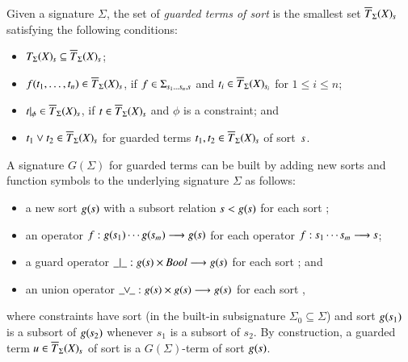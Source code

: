 \begin{definition}\label{def.guarded.guarded}
Given a signature $\Sigma$, the set of \emph{guarded terms of sort
} is the smallest set $\overline{T}_{\Sigma}(X)_{\textit{s}}$
satisfying the following conditions:

\begin{itemize}
	\item ${T}_{\Sigma}(X)_{\textit{s}} \subseteq \overline{T}_{\Sigma}(X)_{\textit{s}}$;
		
	\item $f(t_1,\ldots,t_n) \in \overline{T}_{\Sigma}(X)_{\textit{s}}$,
    if $f\in \Sigma_{\textit{s}_1\ldots \textit{s}_n, \textit{s}}$ and $t_i
    \in \overline{T}_{\Sigma}(X)_{\textit{s}_i}$ for $1 \leq i \leq n$;
	
	\item $t |_{\phi} \in \overline{T}_{\Sigma}(X)_{\textit{s}}$, if $t
    \in \overline{T}_{\Sigma}(X)_{\textit{s}}$ and $\phi$ is a
    constraint; and
	
	\item $t _1 \lor t_2 \in \overline{T}_{\Sigma}(X)_{\textit{s}}$ for
    guarded terms $t_1, t_2 \in \overline{T}_{\Sigma}(X)_{\textit{s}}$
    of sort~$\textit{s}$.
\end{itemize}
\end{definition}

A signature $G(\Sigma)$ for guarded terms can be built by adding
new sorts and function symbols to the underlying signature $\Sigma$ as
follows:


\begin{itemize}
	\item a new sort $g(\textit{s})$ with a subsort relation $\textit{s} <
    g(\textit{s})$ for each sort ;
	
	\item an operator $f : g(\textit{s}_1) \cdots
    g(\textit{s}_m) \longrightarrow g(\textit{s})$ for each operator
    $f : \textit{s}_1 \cdots \textit{s}_m \longrightarrow \textit{s}$;

	\item a guard operator $\_|\_ : g(\textit{s}) \times
    \textit{Bool} \longrightarrow g(\textit{s})$ for each sort ; and

	\item an union operator $\_\!\!\vee\!\!\_ : g(\textit{s}) \times
    g(\textit{s}) \longrightarrow g(\textit{s})$ for each sort ,

\end{itemize}

\noindent
where constraints have sort  (in the built-in subsignature
$\Sigma_0 \subseteq \Sigma$) and sort $g(\textit{s}_1)$ is a subsort of
$g(\textit{s}_2)$ whenever $s_1$ is a subsort of $s_2$.
%
By construction, a guarded term $u \in
\overline{T}_{\Sigma}(X)_{\textit{s}}$ of sort  is a
$G(\Sigma)$-term of sort $g(\textit{s})$.


